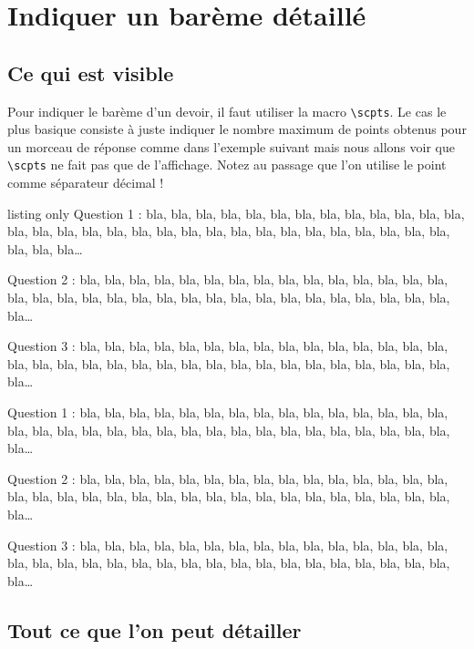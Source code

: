 \documentclass[12pt,a4paper]{scrartcl}
\begin{document}
\section{Indiquer un barème détaillé} \label{exercises:score}

    \subsection{Ce qui est visible}

Pour indiquer le barème d'un devoir, il faut utiliser la macro \verb+\scpts+.
Le cas le plus basique consiste à juste indiquer le nombre maximum de points obtenus pour un morceau de réponse comme dans l'exemple suivant mais nous allons voir que \verb+\scpts+ ne fait pas que de l'affichage. Notez au passage que l'on utilise le point comme séparateur décimal !

\begin{tcblisting}{listing only}
 Question 1 : bla, bla, bla, bla, bla, bla, bla, bla, bla, bla,
bla, bla, bla, bla, bla, bla, bla, bla, bla, bla, bla, bla, bla, bla, bla,
bla, bla, bla, bla, bla, bla, bla, bla, bla\dots

 Question 2 : bla, bla, bla, bla, bla, bla, bla, bla, bla, bla, 
bla, bla, bla, bla, bla, bla, bla, bla, bla, bla, bla, bla, bla, bla, bla,
bla, bla, bla, bla, bla, bla, bla, bla, bla\dots

 Question 3 : bla, bla, bla, bla, bla, bla, bla, bla, bla, bla, 
bla, bla, bla, bla, bla, bla, bla, bla, bla, bla, bla, bla, bla, bla, bla,
bla, bla, bla, bla, bla, bla, bla, bla, bla\dots
\end{tcblisting}

\examplestart{}
 Question 1 : bla, bla, bla, bla, bla, bla, bla, bla, bla, bla,
bla, bla, bla, bla, bla, bla, bla, bla, bla, bla, bla, bla, bla, bla, bla,
bla, bla, bla, bla, bla, bla, bla, bla, bla\dots

 Question 2 : bla, bla, bla, bla, bla, bla, bla, bla, bla, bla, 
bla, bla, bla, bla, bla, bla, bla, bla, bla, bla, bla, bla, bla, bla, bla,
bla, bla, bla, bla, bla, bla, bla, bla, bla\dots

 Question 3 : bla, bla, bla, bla, bla, bla, bla, bla, bla, bla, 
bla, bla, bla, bla, bla, bla, bla, bla, bla, bla, bla, bla, bla, bla, bla,
bla, bla, bla, bla, bla, bla, bla, bla, bla\dots
\exampleend{}



    \subsection{Tout ce que l'on peut détailler}
\end{document}
